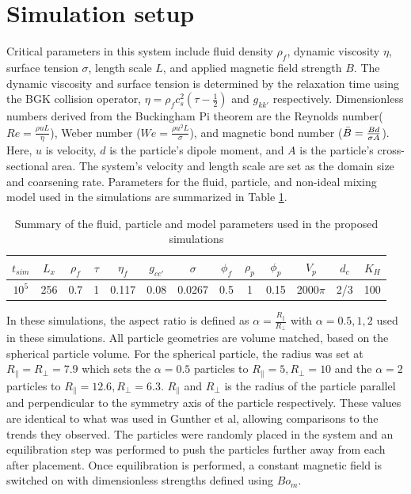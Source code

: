 \section{Simulation setup}

Critical parameters in this system include fluid density $\rho_f$, dynamic viscosity $\eta$, surface tension $\sigma$, length scale $L$, and applied magnetic field strength $B$. The dynamic viscosity and surface tension is determined by the relaxation time using the BGK collision operator, $\eta = \rho_f c_s^2(\tau - \frac{1}{2})$ and $g_{kk'}$ respectively. Dimensionless numbers derived from the Buckingham Pi theorem are the Reynolds number($Re = \frac{\rho u L}{\eta}$), Weber number ($We = \frac{\rho u^2 L}{\sigma}$), and magnetic bond number ($\Bar{B} = \frac{Bd}{\sigma A}$). Here, $u$ is velocity, $d$ is the particle's dipole moment, and $A$ is the particle's cross-sectional area. The system's velocity and length scale are set as the domain size and coarsening rate. Parameters for the fluid, particle, and non-ideal mixing model used in the simulations are summarized in Table \ref{table:model_params}.

\begin{table}[h!]
\centering
\begin{tabular}{||c c c c c c c c c c c c c||} 
 \hline
 $t_{sim}$ & $L_x$ & $\rho_f$ & $\tau$ & $\eta_f$ & $g_{cc'}$ & $\sigma$ & $\phi_f$ & $\rho_p$ & $\phi_p$ & $V_p$ & $d_c$ & $K_H$ \\ [0.5ex] 
 \hline\hline
 $10^5$ & 256 & 0.7 & 1 & 0.117 & 0.08 & 0.0267 & 0.5 & 1 & 0.15 & 2000$\pi$ & 2/3 & 100\\ [1ex] 
 \hline
\end{tabular}
\caption{Summary of the fluid, particle and model parameters used in the proposed simulations}
\label{table:model_params}
\end{table}

In these simulations, the aspect ratio is defined as $\alpha = \frac{R_{\parallel}}{R_{\perp}}$ with $\alpha = 0.5, 1, 2$ used in these simulations. All particle geometries are volume matched, based on the spherical particle volume. For the spherical particle, the radius was set at $R_{\parallel} = R_{\perp} = 7.9$ which sets the $\alpha = 0.5$ particles to $R_{\parallel} = 5, R_{\perp} = 10$ and the $\alpha = 2$ particles to $R_{\parallel} = 12.6, R_{\perp} = 6.3$. $R_{\parallel}$ and $R_{\perp}$ is the radius of the particle parallel and perpendicular to the symmetry axis of the particle respectively. These values are identical to what was used in Gunther et al, allowing comparisons to the trends they observed. \cite{gunther_timescales_2014} The particles were randomly placed in the system and an equilibration step was performed to push the particles further away from each after placement. Once equilibration is performed, a constant magnetic field is switched on with dimensionless strengths defined using $Bo_m$.

